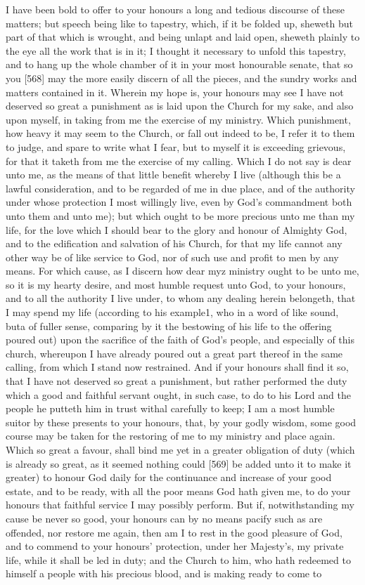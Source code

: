 I have been bold to offer to your honours a long and tedious discourse of these matters; but speech being like to tapestry, which, if it be folded up, sheweth but part of that which is wrought, and being unlapt and laid open, sheweth plainly to the eye all the work that is in it; I thought it necessary to unfold this tapestry, and to hang up the whole chamber of it in your most honourable senate, that so you [568] may the more easily discern of all the pieces, and the sundry works and matters contained in it. Wherein my hope is, your honours may see I have not deserved so great a punishment as is laid upon the Church for my sake, and also upon myself, in taking from me the exercise of my ministry. Which punishment, how heavy it may seem to the Church, or fall out indeed to be, I refer it to them to judge, and spare to write what I fear, but to myself it is exceeding grievous, for that it taketh from me the exercise of my calling. Which I do not say is dear unto me, as the means of that little benefit whereby I live (although this be a lawful consideration, and to be regarded of me in due place, and of the authority under whose protection I most willingly live, even by God’s commandment both unto them and unto me); but which ought to be more precious unto me than my life, for the love which I should bear to the glory and honour of Almighty God, and to the edification and salvation of his Church, for that my life cannot any other way be of like service to God, nor of such use and profit to men by any means. For which cause, as I discern how dear myz ministry ought to be unto me, so it is my hearty desire, and most humble request unto God, to your honours, and to all the authority I live under, to whom any dealing herein belongeth, that I may spend my life (according to his example1, who in a word of like sound, buta of fuller sense, comparing by it the bestowing of his life to the offering poured out) upon the sacrifice of the faith of God’s people, and especially of this church, whereupon I have already poured out a great part thereof in the same calling, from which I stand now restrained. And if your honours shall find it so, that I have not deserved so great a punishment, but rather performed the duty which a good and faithful servant ought, in such case, to do to his Lord and the people he putteth him in trust withal carefully to keep; I am a most humble suitor by these presents to your honours, that, by your godly wisdom, some good course may be taken for the restoring of me to my ministry and place again. Which so great a favour, shall bind me yet in a greater obligation of duty (which is already so great, as it seemed nothing could [569] be added unto it to make it greater) to honour God daily for the continuance and increase of your good estate, and to be ready, with all the poor means God hath given me, to do your honours that faithful service I may possibly perform. But if, notwithstanding my cause be never so good, your honours can by no means pacify such as are offended, nor restore me again, then am I to rest in the good pleasure of God, and to commend to your honours’ protection, under her Majesty’s, my private life, while it shall be led in duty; and the Church to him, who hath redeemed to himself a people with his precious blood, and is making ready to come to 